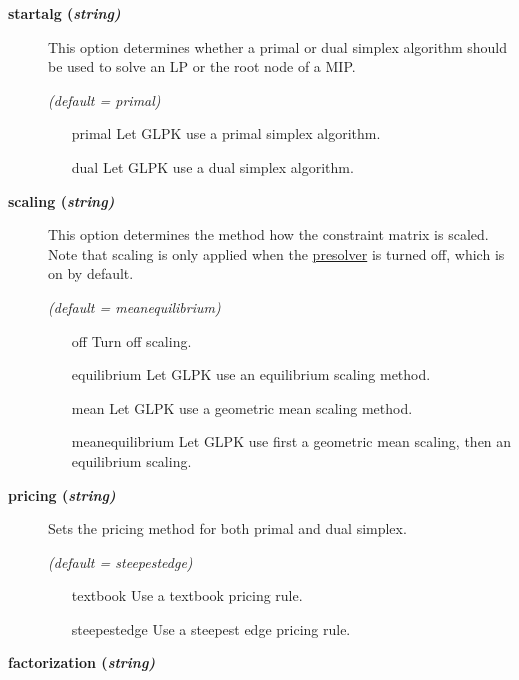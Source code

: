 \begin{description}

\item[\label{glpkstartalg}\hypertarget{glpkstartalg}
{\textbf{startalg (\slshape{string})}}]\hspace{1.0in}

This option determines whether a primal or dual simplex algorithm should be used to solve an LP or the root node of a MIP.

\textsl{(default = primal)}
\begin{itemize}
\item[primal] 
Let GLPK use a primal simplex algorithm.
\item[dual] 
Let GLPK use a dual simplex algorithm.
\end{itemize}

\item[\label{glpkscaling}\hypertarget{glpkscaling}
{\textbf{scaling (\slshape{string})}}]\hspace{1.0in}

This option determines the method how the constraint matrix is scaled.
Note that scaling is only applied when the \hyperlink{presolve}{presolver} is turned off, which is on by default.

\textsl{(default = meanequilibrium)}
\begin{itemize}
\item[off] 
Turn off scaling.
\item[equilibrium] 
Let GLPK use an equilibrium scaling method.
\item[mean] 
Let GLPK use a geometric mean scaling method.
\item[meanequilibrium] 
Let GLPK use first a geometric mean scaling, then an equilibrium scaling.
\end{itemize}

\item[\label{pricing}\hypertarget{pricing}
{\textbf{pricing (\slshape{string})}}]\hspace{1.0in}

Sets the pricing method for both primal and dual simplex.

\textsl{(default = steepestedge)}
\begin{itemize}
\item[textbook] 
Use a textbook pricing rule.
\item[steepestedge] 
Use a steepest edge pricing rule.
\end{itemize}

\item[\label{factorization}\hypertarget{factorization}
{\textbf{factorization (\slshape{string})}}]\hspace{1.0in}


\end{description}
